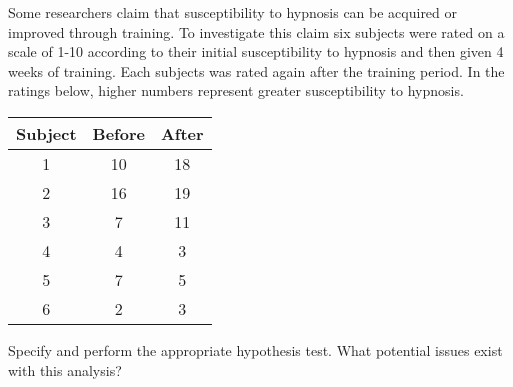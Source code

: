 
\begin{exercise}

Some researchers claim that susceptibility to hypnosis can be acquired
or improved through training. To investigate this claim six subjects
were rated on a scale of 1-10 according to their initial susceptibility
to hypnosis and then given 4 weeks of training. Each subjects was rated
again after the training period. In the ratings below, higher numbers
represent greater susceptibility to hypnosis.

\begin{center}
    \begin{tabular}{c|c|c}
    \hline
    Subject & Before & After \\
    \hline
    1 & 10 & 18 \\
    2 & 16 & 19 \\
    3 & 7 & 11 \\
    4 & 4 & 3 \\
    5 & 7 & 5 \\
    6 & 2 & 3 \\
    \hline
    \end{tabular}
\end{center}

Specify and perform the appropriate hypothesis test. What potential issues
exist with this analysis?

\end{exercise}


